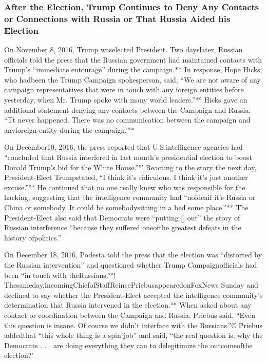 \subsubsection{After the Election, Trump Continues to Deny Any Contacts or Connections with Russia or That Russia Aided his Election}

On November 8, 2016, Trump waselected President. Two dayslater, Russian officials told the press that the Russian government had maintained contacts with Trump’s “immediate entourage” during the campaign.** In response, Hope Hicks, who hadbeen the Trump Campaign spokesperson, said, “We are not aware of any campaign representatives that were in touch with any foreign entities before yesterday, when Mr. Trump spoke with many world leaders.”*° Hicks gave an additional statement denying any contacts between the Campaign and Russia: “Tt never happened. There was no communication between the campaign and anyforeign entity during the campaign.”°°

On December10, 2016, the press reported that U.S.intelligence agencies had “concluded that Russia interfered in last month’s presidential election to boost Donald Trump’s bid for the White House.”°’ Reacting to the story the next day, President-Elect Trumpstated, “I think it’s ridiculous. I think it’s just another excuse.”°* He continued that no one really knew who was responsible for the hacking, suggesting that the intelligence community had “noideaif it’s Russia or China or somebody. It could be somebodysitting in a bed some place.”** The President-Elect also said that Democrats were “putting [] out” the story of Russian interference “because they suffered oneofthe greatest defeats in the history ofpolitics.”

On December 18, 2016, Podesta told the press that the election was “distorted by the Russian intervention” and questioned whether Trump Campaignofficials had been “in touch with theRussians.”°! Thesameday,incomingChiefofStaffReincePriebusappearedonFoxNews Sunday and declined to say whether the President-Elect accepted the intelligence community’s determination that Russia intervened in the election.°* When asked about any contact or coordination between the Campaign and Russia, Priebus said, “Even this question is insane. Of course we didn’t interface with the Russians.”© Priebus addedthat “this whole thing is a spin job” and said, “the real question is, why the Democrats . . . are doing everything they can to delegitimize the outcomeofthe election?’

